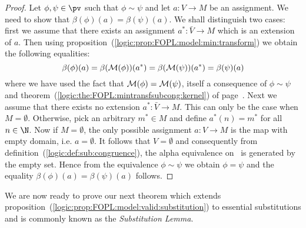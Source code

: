 \begin{proof}
Let $\phi,\psi\in\pv$ such that $\phi\sim\psi$ and let $a:V\to M$ be
an assignment. We need to show that $\beta(\phi)(a)=\beta(\psi)(a)$.
We shall distinguish two cases: first we assume that there exists an
assignment $a^{*}:\bar{V}\to M$ which is an extension of $a$. Then
using proposition~(\ref{logic:prop:FOPL:model:min:transform}) we
obtain the following equalities:
    \[
    \beta(\phi)(a)=\beta({\cal M}(\phi))(a^{*})=\beta({\cal
    M}(\psi))(a^{*})=\beta(\psi)(a)
    \]
where we have used the fact that ${\cal M}(\phi)={\cal M}(\psi)$,
itself a consequence of $\phi\sim\psi$ and
theorem~(\ref{logic:the:FOPL:mintransfsubcong:kernel}) of
page~\pageref{logic:the:FOPL:mintransfsubcong:kernel}. Next we
assume that there exists no extension $a^{*}:\bar{V}\to M$. This can
only be the case when $M=\emptyset$. Otherwise, pick an arbitrary
$m^{*}\in M$ and define $a^{*}(n)=m^{*}$ for all $n\in\N$. Now if
$M=\emptyset$, the only possible assignment $a:V\to M$ is the map
with empty domain, i.e. $a=\emptyset$. It follows that $V=\emptyset$
and consequently from definition~(\ref{logic:def:sub:congruence}),
the alpha equivalence on \pv\ is generated by the empty set.
Hence from the equivalence $\phi\sim\psi$ we obtain $\phi=\psi$ and
the equality $\beta(\phi)(a)=\beta(\psi)(a)$ follows.
\end{proof}

We are now ready to prove our next theorem which extends
proposition~(\ref{logic:prop:FOPL:model:valid:substitution}) to
essential substitutions and is commonly known as the {\em
Substitution Lemma}.

